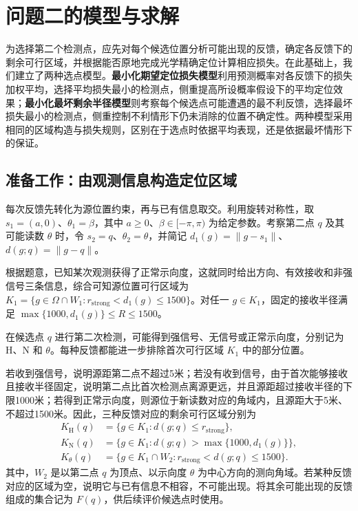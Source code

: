 \documentclass[UTF8,a4paper,zihao=-4,fontset=none]{ctexart}
\begin{document}
\section{问题二的模型与求解}

为选择第二个检测点，应先对每个候选位置分析可能出现的反馈，确定各反馈下的剩余可行区域，并根据能否原地完成光学精确定位计算相应损失。在此基础上，我们建立了两种选点模型。\textbf{最小化期望定位损失模型}利用预测概率对各反馈下的损失加权平均，选择平均损失最小的检测点，侧重提高所设概率假设下的平均定位效果；\textbf{最小化最坏剩余半径模型}则考察每个候选点可能遭遇的最不利反馈，选择最坏损失最小的检测点，侧重控制不利情形下仍未消除的位置不确定性。两种模型采用相同的区域构造与损失规则，区别在于选点时依据平均表现，还是依据最坏情形下的保证。

\subsection{准备工作：由观测信息构造定位区域}

每次反馈先转化为源位置约束，再与已有信息取交。利用旋转对称性，取 \(s_1=(a,0)\)、\(\theta_1=\beta\)，其中 \(a\ge0\)、\(\beta\in[-\pi,\pi)\) 为给定参数。考察第二点 \(q\) 及其可能读数 \(\theta\) 时，令 \(s_2=q\)、\(\theta_2=\theta\)，并简记 \(d_1(g)=\|g-s_1\|\)、\(d(g;q)=\|g-q\|\)。

根据题意，已知某次观测获得了正常示向度，这就同时给出方向、有效接收和非强信号三条信息，综合可知源位置可行区域为 \(K_1=\{g\in\Omega\cap W_1:r_{\mathrm{strong}}<d_1(g)\le1500\}\)。对任一 \(g\in K_1\)，固定的接收半径满足 \(\max\{1000,d_1(g)\}\le R\le1500\)。

在候选点 \(q\) 进行第二次检测，可能得到强信号、无信号或正常示向度，分别记为 \(\mathrm H\)、\(\mathrm N\) 和 \(\theta\)。每种反馈都能进一步排除首次可行区域 \(K_1\) 中的部分位置。

若收到强信号，说明源距第二点不超过5米；若没有收到信号，由于首次能够接收且接收半径固定，说明第二点比首次检测点离源更远，并且源距超过接收半径的下限1000米；若得到正常示向度，则源位于新读数对应的角域内，且源距大于5米、不超过1500米。因此，三种反馈对应的剩余可行区域分别为
\begin{equation}
\begin{aligned}
K_{\mathrm H}(q)&=\{g\in K_1:d(g;q)\le r_{\mathrm{strong}}\},\\
K_{\mathrm N}(q)&=\{g\in K_1:d(g;q)>\max\{1000,d_1(g)\}\},\\
K_\theta(q)&=\{g\in K_1\cap W_2:r_{\mathrm{strong}}<d(g;q)\le1500\}.
\end{aligned}
\label{eq:q2-pair-regions}
\end{equation}
其中，\(W_2\) 是以第二点 \(q\) 为顶点、以示向度 \(\theta\) 为中心方向的测向角域。若某种反馈对应的区域为空，说明它与已有信息不相容，不可能出现。将其余可能出现的反馈组成的集合记为 \(F(q)\)，供后续评价候选点时使用。
\end{document}
